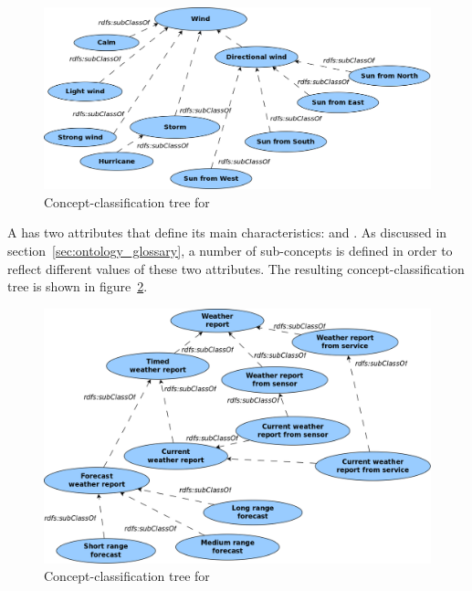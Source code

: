 \begin{figure}
  \centering
  \includegraphics[width=\textwidth]{figures/diagrams/wind.png}
  \caption{Concept-classification tree for }
  \label{fig:tree_wind}
\end{figure}

A  has two attributes that define its main characteristics:  and . As discussed in section~\ref{sec:ontology_glossary}, a number of sub-concepts is defined in order to reflect different values of these two attributes. The resulting concept-classification tree is shown in figure~\ref{fig:tree_weather_report}.

\begin{figure}
  \centering
  \includegraphics[width=\textwidth]{figures/diagrams/weather-report.png}
  \caption{Concept-classification tree for }
  \label{fig:tree_weather_report}
\end{figure}

